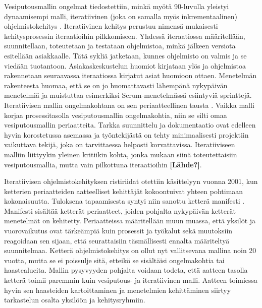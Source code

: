 Vesiputousmallin ongelmat tiedostettiin, minkä myötä 90-luvulla yleistyi dynaamisempi malli, iteratiivinen (joka on samalla myös inkrementaalinen) ohjelmistokehitys \cite{1204375}. Iteratiivinen kehitys perustuu nimensä mukaisesti kehitysprosessin iteraatioihin pilkkomiseen. Yhdessä iteraatiossa määritellään, suunnitellaan, toteutetaan ja testataan ohjelmistoa, minkä jälkeen versiota esitellään asiakkaalle. Tätä sykliä jatketaan, kunnes ohjelmisto on valmis ja se viedään tuotantoon. Asiakaskeskustelun huomiot kirjataan ylös ja ohjelmistoa rakennetaan seuraavassa iteraatiossa kirjatut asiat huomioon ottaen. Menetelmän rakenteesta huomaa, että se on jo huomattavasti lähempänä nykypäivän menetelmiä ja muistuttaa esimerkiksi Scrum-menetelmässä \cite{SCRUMORG} esiintyviä sprinttejä. Iteratiivisen mallin ongelmakohtana on sen periaatteellinen tausta \cite{1204375}. Vaikka malli korjaa prosessitasolla vesiputousmallin ongelmakohtia, niin se silti omaa vesiputousmallin periaatteita. Tarkka suunnittelu ja dokumentaatio ovat edelleen hyvin korostetussa asemassa ja työntekijästä on tehty minimaalisesti projektiin vaikuttava tekijä, joka on tarvittaessa helposti korvattavissa. Iteratiiviseen malliin liittyykin yleinen kritiikin kohta, jonka mukaan siinä toteutettaisiin vesiputousmallia, mutta vain pilkottuna iteraatioihin \textbf{[Lähde?]}. 

Iteratiivisen ohjelmistokehityksen ristiriidat otettiin käsittelyyn vuonna 2001, kun ketterien periaatteiden aatteelliset kehittäjät kokoontuivat yhteen pohtimaan kokonaisuutta. Tuloksena tapaamisesta syntyi niin sanottu ketterä manifesti \cite{beck2001agile}. Manifesti sisältää ketterät periaatteet, joiden pohjalta nykypäivän ketterät menetelmät on kehitetty. Periaatteissa määritellään muun muassa, että yksilöt ja vuorovaikutus ovat tärkeämpiä kuin prosessit ja työkalut sekä muutoksiin reagoidaan sen sijaan, että seurattaisiin täsmällisesti ennalta määriteltyä suunnitelmaa. Ketterä ohjelmistokehitys on ollut nyt vallitsevana mallina noin 20 vuotta, mutta se ei poissulje sitä, etteikö se sisältäisi ongelmakohtia tai haastealueita. Mallin pysyvyyden pohjalta voidaan todeta, että aatteen tasolla ketterä toimii paremmin kuin vesiputous- ja iteratiivinen malli. Aatteen toimiessa hyvin sen haasteiden kartoittaminen ja menetelmien kehittäminen siirtyy tarkastelun osalta yksilöön ja kehitysryhmiin.

